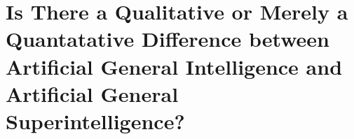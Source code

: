 \section{Is There a Qualitative or Merely a Quantatative Difference between Artificial General Intelligence and Artificial General Superintelligence?}
